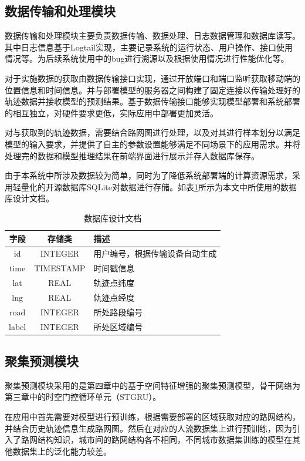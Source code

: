 \documentclass[master]{thesis-uestc}
\begin{document}
\subsection{数据传输和处理模块}
数据传输和处理模块主要负责数据传输、数据处理、日志数据管理和数据库读写。其中日志信息基于Logtail实现，主要记录系统的运行状态、用户操作、接口使用情况等。为后续系统使用中的bug进行溯源以及根据使用情况进行性能优化等。

对于实施数据的获取由数据传输接口实现，通过开放端口和端口监听获取移动端的位置信息和时间信息。并与部署模型的服务器之间构建了固定连接以传输处理好的轨迹数据并接收模型的预测结果。基于数据传输接口能够实现模型部署和系统部署的相互独立，对硬件要求更低，实际应用中部署更加灵活。

对与获取到的轨迹数据，需要结合路网图进行处理，以及对其进行样本划分以满足模型的输入要求，并提供了自主的参数设置能够满足不同场景下的应用需求。并将处理完的数据和模型推理结果在前端界面进行展示并存入数据库保存。

由于本系统中所涉及数据较为简单，同时为了降低系统部署端的计算资源需求，采用轻量化的开源数据库SQLite对数据进行存储。如表\ref{Table.5.1}所示为本文中所使用的数据库设计文档。
\begin{table}[!ht]
\centering
\caption{数据库设计文档}%
\label{Table.5.1}
\begin{tabular}{ccl}
\hline
字段& 存储类 & 描述\\
\hline
id& INTEGER &用户编号，根据传输设备自动生成\\
time& TIMESTAMP &时间戳信息\\
lat&  REAL &轨迹点纬度\\
lng& REAL &轨迹点经度\\
road& INTEGER &所处路段编号\\
label& INTEGER &所处区域编号\\
\hline
\end{tabular}
\end{table}

\subsection{聚集预测模块}
聚集预测模块采用的是第四章中的基于空间特征增强的聚集预测模型，骨干网络为第三章中的时空门控循环单元（STGRU）。

在应用中首先需要对模型进行预训练，根据需要部署的区域获取对应的路网结构，并结合历史轨迹信息生成路网图。然后在对应的人流数据集上进行预训练，因为引入了路网结构知识，城市间的路网结构各不相同，不同城市数据集训练的模型在其他数据集上的泛化能力较差。
\end{document}
